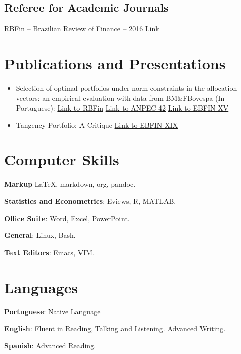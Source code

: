 \documentclass[10pt, a4paper]{article}
\begin{document}
\vspace{-12pt}
\subsection{Referee for Academic Journals}
RBFin -- Brazilian Review of Finance -- 2016
\href{http://bibliotecadigital.fgv.br/ojs/index.php/rbfin/article/view/70380/67907}{Link}

\vspace{-6pt}
\section{Publications and Presentations}

\begin{itemize}[noitemsep]

\item
Selection of optimal portfolios under norm constraints in the allocation vectors: an empirical evaluation with data from BM\&FBovespa (In Portuguese):
\hspace{2pt}
\href{http://bibliotecadigital.fgv.br/ojs/index.php/rbfin/article/view/52081}{Link to RBFin}
\hspace{2pt}
\href{https://www.anpec.org.br/encontro/2014/submissao/files_I/i8-4ddb23813d689d5ae684d5162e07302a.pdf}{Link to ANPEC 42}
\hspace{2pt}
\href{http://bibliotecadigital.fgv.br/ocs/index.php/ebf/15EBFin/paper/view/4971}{Link to EBFIN XV}

\item
Tangency Portfolio: A Critique
\href{http://sbfin.org.br/files/relatorio_de_artigos_final.pdf}{Link to EBFIN XIX}
\end{itemize}

\vspace{-12pt}
\section{Computer Skills}

\textbf{Markup} \LaTeX, markdown, org, pandoc.

\textbf{Statistics and Econometrics}: Eviews, R, MATLAB.

\textbf{Office Suite}: Word, Excel, PowerPoint.

\textbf{General}: Linux, Bash.

\textbf{Text Editors}: Emacs, VIM.

\vspace{-6pt}
\section{Languages}

\textbf{Portuguese}: Native Language

\textbf{English}: Fluent in Reading, Talking and Listening. Advanced Writing.

\textbf{Spanish}: Advanced Reading.

\end{document}
